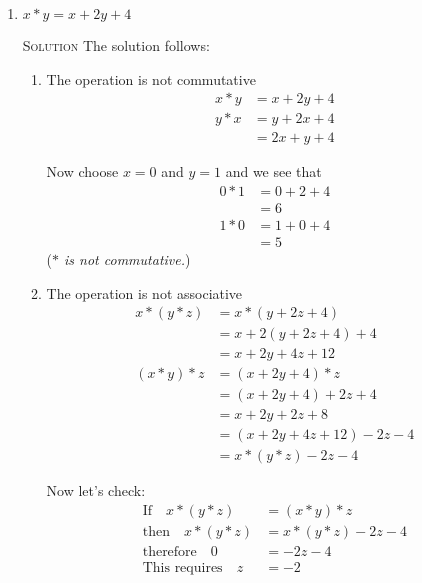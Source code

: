 \documentclass[twoside]{amsart}
\newcommand{\Solution}{\textsc{Solution}\xspace}
\newcommand{\brk}{\vspace{5pt}}
\newcommand{\noindsol}{\noindent\Solution}
\begin{document}
\begin{enumerate}[label=\protect{\textbf{\arabic*}}, leftmargin=1em]

\item $x*y = x + 2y + 4$

  \brk \noindsol The solution follows:

  \begin{enumerate}[label=\protect{({\roman*})}]
  \item The operation is not commutative
    \begin{align*}
        x * y & = x + 2y + 4 \\
        y * x & = y + 2x + 4 \\
              & = 2x + y + 4
    \end{align*}

    Now choose $x=0$ and $y=1$ and we see that
    \begin{align*}
       0 * 1 & = 0 + 2 + 4 \\
             & = 6         \\
       1 * 0 & = 1 + 0 + 4 \\
             & = 5
    \end{align*}
    (\emph{$*$ is not commutative.}) \brk

  \item The operation is not associative
    \begin{align*}
        x * (y * z) & = x * (y + 2z + 4)      \\
                    & = x + 2(y + 2z + 4) + 4 \\
                    & = x + 2y + 4z + 12      \\
        (x * y) * z
                    & = (x + 2y + 4) * z      \\
                    & = (x + 2y + 4) + 2z + 4 \\
                    & = x + 2y + 2z + 8       \\
                    & = (x + 2y + 4z + 12) - 2z - 4 \\
                    & = x * (y * z) - 2z - 4  
    \end{align*}

    Now let's check:
    \begin{align*}
    \text{If} \quad x * (y * z)   & = (x * y) * z         \\
    \text{then} \quad x * (y * z) & = x * (y * z) - 2z -4 \\
    \text{therefore} \quad 0      & = -2z - 4             \\
    \text{This requires} \quad z  & = -2
    \end{align*}


\end{enumerate}
\end{enumerate}
\end{document}
